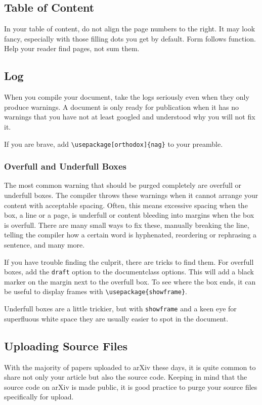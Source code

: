 \subsection{Table of Content}
In your table of content, do not align the page numbers to the right.
It may look fancy, especially with those filling dots you get by default.
Form follows function. Help your reader find pages, not sum them.

\subsection{Log}
When you compile your document, take the logs seriously even when they only produce warnings.
A document is only ready for publication when it has no warnings that you have not at least googled and understood why you will not fix it.

If you are brave, add \verb|\usepackage[orthodox]{nag}| to your preamble.

\subsubsection{Overfull and Underfull Boxes}
The most common warning that should be purged completely are overfull or underfull boxes.
The compiler throws these warnings when it cannot arrange your content with acceptable spacing.
Often, this means excessive spacing when the box, a line or a page, is underfull or content bleeding into margins when the box is overfull.
There are many small ways to fix these, manually breaking the line, telling the compiler how a certain word is hyphenated, reordering or rephrasing a sentence, and many more.

If you have trouble finding the culprit, there are tricks to find them.
For overfull boxes, add the \verb|draft| option to the documentclass options.
This will add a black marker on the margin next to the overfull box.
To see where the box ends, it can be useful to display frames with \verb|\usepackage{showframe}|.

Underfull boxes are a little trickier, but with \verb|showframe| and a keen eye for superfluous white space they are usually easier to spot in the document.	

\subsection{Uploading Source Files}
With the majority of papers uploaded to arXiv these days, it is quite common to share not only your article but also the source code.
Keeping in mind that the source code on arXiv is made public, it is good practice to purge your source files specifically for upload.

